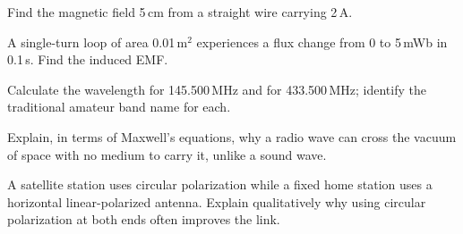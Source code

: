 \begin{practiceproblems}
\item Find the magnetic field 5\,cm from a straight wire carrying 2\,A.
\item A single-turn loop of area 0.01\,m$^2$ experiences a flux change
from 0 to 5\,mWb in 0.1\,s. Find the induced EMF.
\item Calculate the wavelength for 145.500\,MHz and for 433.500\,MHz;
identify the traditional amateur band name for each.
\item Explain, in terms of Maxwell's equations, why a radio wave can
cross the vacuum of space with no medium to carry it, unlike a sound
wave.
\item A satellite station uses circular polarization while a fixed home
station uses a horizontal linear-polarized antenna. Explain qualitatively
why using circular polarization at both ends often improves the link.
\end{practiceproblems}

